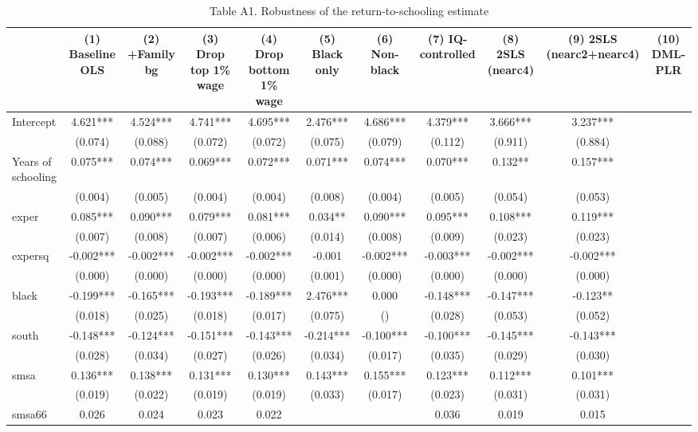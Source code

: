 \begin{table}[htbp]
\centering
\caption{Table A1. Robustness of the return-to-schooling estimate}
\begin{tabular}{lcccccccccc}
\hline\hline
 & (1) Baseline OLS & (2) +Family bg & (3) Drop top 1\% wage & (4) Drop bottom 1\% wage & (5) Black only & (6) Non-black & (7) IQ-controlled & (8) 2SLS (nearc4) & (9) 2SLS (nearc2+nearc4) & (10) DML-PLR \\
\hline
Intercept & 4.621*** & 4.524*** & 4.741*** & 4.695*** & 2.476*** & 4.686*** & 4.379*** & 3.666*** & 3.237*** &  \\
 & (0.074) & (0.088) & (0.072) & (0.072) & (0.075) & (0.079) & (0.112) & (0.911) & (0.884) &  \\
Years of schooling & 0.075*** & 0.074*** & 0.069*** & 0.072*** & 0.071*** & 0.074*** & 0.070*** & 0.132** & 0.157*** &  \\
 & (0.004) & (0.005) & (0.004) & (0.004) & (0.008) & (0.004) & (0.005) & (0.054) & (0.053) &  \\
exper & 0.085*** & 0.090*** & 0.079*** & 0.081*** & 0.034** & 0.090*** & 0.095*** & 0.108*** & 0.119*** &  \\
 & (0.007) & (0.008) & (0.007) & (0.006) & (0.014) & (0.008) & (0.009) & (0.023) & (0.023) &  \\
expersq & -0.002*** & -0.002*** & -0.002*** & -0.002*** & -0.001 & -0.002*** & -0.003*** & -0.002*** & -0.002*** &  \\
 & (0.000) & (0.000) & (0.000) & (0.000) & (0.001) & (0.000) & (0.000) & (0.000) & (0.000) &  \\
black & -0.199*** & -0.165*** & -0.193*** & -0.189*** & 2.476*** & 0.000 & -0.148*** & -0.147*** & -0.123** &  \\
 & (0.018) & (0.025) & (0.018) & (0.017) & (0.075) & () & (0.028) & (0.053) & (0.052) &  \\
south & -0.148*** & -0.124*** & -0.151*** & -0.143*** & -0.214*** & -0.100*** & -0.100*** & -0.145*** & -0.143*** &  \\
 & (0.028) & (0.034) & (0.027) & (0.026) & (0.034) & (0.017) & (0.035) & (0.029) & (0.030) &  \\
smsa & 0.136*** & 0.138*** & 0.131*** & 0.130*** & 0.143*** & 0.155*** & 0.123*** & 0.112*** & 0.101*** &  \\
 & (0.019) & (0.022) & (0.019) & (0.019) & (0.033) & (0.017) & (0.023) & (0.031) & (0.031) &  \\
smsa66 & 0.026 & 0.024 & 0.023 & 0.022 &  &  & 0.036 & 0.019 & 0.015 &  \\

\end{tabular}
\end{table}
